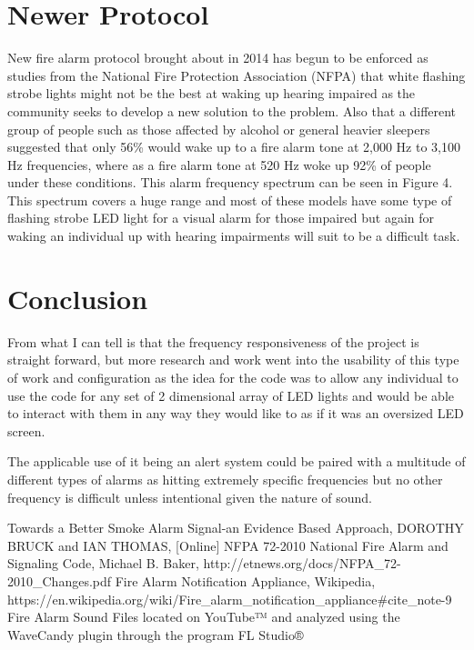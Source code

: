 \documentclass[conference]{IEEEtran}
\begin{document}
\section{Newer Protocol}
New fire alarm protocol brought about in 2014 has begun to be enforced as studies from the National Fire Protection Association (NFPA) that white flashing strobe lights might not be the best at waking up hearing impaired as the community seeks to develop a new solution to the problem. Also that a different group of people such as those affected by alcohol or general heavier sleepers suggested that only 56\% would wake up to a fire alarm tone at 2,000 Hz to 3,100 Hz frequencies, where as a fire alarm tone at 520 Hz woke up 92\% of people under these conditions. This alarm frequency spectrum can be seen in Figure 4. This spectrum covers a huge range and most of these models have some type of flashing strobe LED light for a visual alarm for those impaired but again for waking an individual up with hearing impairments will suit to be a difficult task.


\section{Conclusion}
From what I can tell is that the frequency responsiveness of the project is straight forward, but more research and work went into the usability of this type of work and configuration as the idea for the code was to allow any individual to use the code for any set of 2 dimensional array of LED lights and would be able to interact with them in any way they would like to as if it was an oversized LED screen.

The applicable use of it being an alert system could be paired with a multitude of different types of alarms as hitting extremely specific frequencies but no other frequency is difficult unless intentional given the nature of sound.


\begin{thebibliography}{00}
 Towards a Better Smoke Alarm Signal-an Evidence Based Approach, DOROTHY BRUCK and IAN THOMAS, [Online] 
 NFPA 72-2010 National Fire Alarm and Signaling Code, Michael B. Baker, http://etnews.org/docs/NFPA\_72-2010\_Changes.pdf
 Fire Alarm Notification Appliance, Wikipedia, https://en.wikipedia.org/wiki/Fire\_alarm\_notification\_appliance\#cite\_note-9
 Fire Alarm Sound Files located on YouTube™ and analyzed using the WaveCandy plugin through the program FL Studio®
\end{thebibliography}
\end{document}
